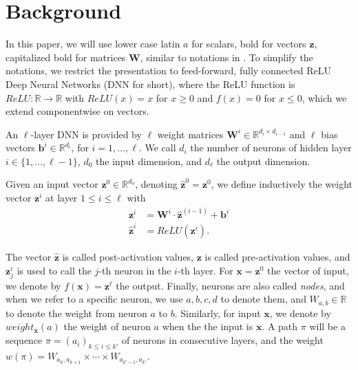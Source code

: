 \documentclass{llncs}
\newcommand{\vz}{\boldsymbol{z}}
\begin{document}
\section{Background}

In this paper, we will use lower case latin $a$ for scalars, bold for vectors $\boldsymbol{z}$, 
capitalized bold for matrices $\boldsymbol{W}$, similar to notations in \cite{prima,crown}.
To simplify the notations, we restrict the presentation to feed-forward, 
fully connected ReLU Deep Neural Networks (DNN for short), where the ReLU function is $ReLU : \mathbb{R} \rightarrow \mathbb{R}$ with
$ReLU(x)=x$ for $x \geq 0$ and $f(x)=0$ for $x \leq 0$, which we extend componentwise on vectors.




An $\ell$-layer DNN is provided by $\ell$ weight matrices 
$\boldsymbol{W}^i \in \mathbb{R}^{d_i\times d_{i-1}}$
and $\ell$ bias vectors $\boldsymbol{b}^i \in \mathbb{R}^{d_i}$, for $i=1, \ldots, \ell$.
We call $d_i$ the number of neurons of hidden layer $i \in \{1, \ldots, \ell-1\}$,
$d_0$ the input dimension, and $d_\ell$ the output dimension.

Given an input vector $\boldsymbol{z}^0 \in \mathbb{R}^{d_0}$, 
denoting $\hat{\boldsymbol{z}}^{0}={\boldsymbol{z}}^0$, we define inductively the weight vector $\boldsymbol{z}^i$ at layer $1 \leq i \leq \ell$ with
\begin{align*}
	{\boldsymbol{z}}^{i} &= \boldsymbol{W}^i\cdot \hat{\boldsymbol{z}}^{(i-1)}+ \boldsymbol{b}^i\\
	\hat{\boldsymbol{z}}^{i} &= ReLU({\boldsymbol{z}}^i).
\end{align*} 

The vector $\hat{\boldsymbol{z}}$ is called post-activation values, 
$\boldsymbol{z}$ is called pre-activation values, 
and $\boldsymbol{z}^{i}_j$ is used to call the $j$-th neuron in the $i$-th layer. 
For $\boldsymbol{x}=\vz^0$ the vector of input, we denote by $f(\boldsymbol{x})=\vz^\ell$ the output. Finally, neurons are also called \emph{nodes}, and when we refer to a specific neuron, we use $a,b,c,d$ to denote them, and $W_{a,b} \in \mathbb{R}$ to denote the weight from neuron $a$ to $b$. Similarly, for input $\boldsymbol{x}$, we denote by $weight_{\boldsymbol{x}}(a)$ the weight of neuron $a$ when the the input is $\boldsymbol{x}$. A path $\pi$ will be a sequence 
$\pi=(a_i)_{k \leq  i \leq k'}$ of neurons in consecutive layers, and the weight $w(\pi)=W_{a_k,a_{k+1}} \times \cdots \times  W_{a_{k'-1},a_{k'}}$.
\end{document}
